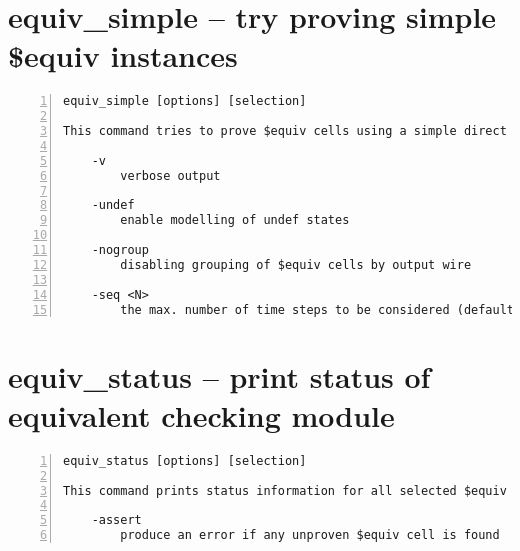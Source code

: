 \section{equiv\_simple -- try proving simple \$equiv instances}
\label{cmd:equiv_simple}
\begin{lstlisting}[numbers=left,frame=single]
    equiv_simple [options] [selection]

This command tries to prove $equiv cells using a simple direct SAT approach.

    -v
        verbose output

    -undef
        enable modelling of undef states

    -nogroup
        disabling grouping of $equiv cells by output wire

    -seq <N>
        the max. number of time steps to be considered (default = 1)
\end{lstlisting}

\section{equiv\_status -- print status of equivalent checking module}
\label{cmd:equiv_status}
\begin{lstlisting}[numbers=left,frame=single]
    equiv_status [options] [selection]

This command prints status information for all selected $equiv cells.

    -assert
        produce an error if any unproven $equiv cell is found
\end{lstlisting}

